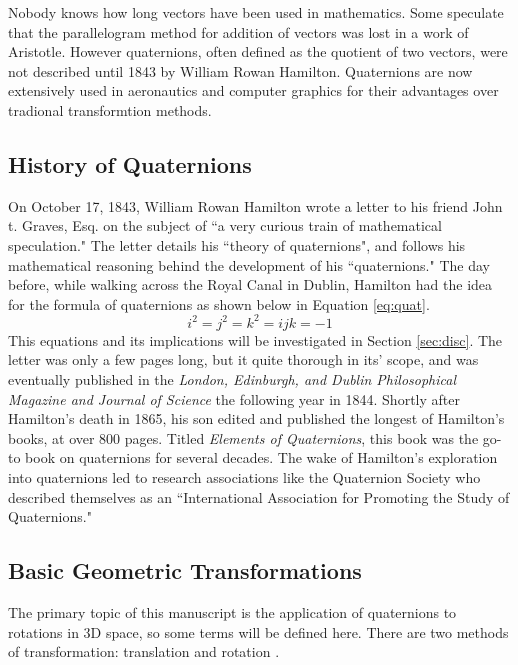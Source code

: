 Nobody knows how long vectors have been used in mathematics.
Some speculate that the parallelogram method for addition of vectors was lost in a work of Aristotle.
However quaternions, often defined as the quotient of two vectors, were not described until 1843 by William Rowan Hamilton.
Quaternions are now extensively used in aeronautics and computer graphics for their advantages over tradional transformtion methods.


\subsection{History of Quaternions}

On October 17, 1843, William Rowan Hamilton wrote a letter to his friend John t. Graves, Esq. on the subject of ``a very curious train of mathematical speculation."
The letter details his ``theory of quaternions", and follows his mathematical reasoning behind the development of his ``quaternions."
The day before, while walking across the Royal Canal in Dublin, Hamilton had the idea for the formula of quaternions as shown below in Equation \ref{eq:quat}.
\begin{equation}
\label{eq:quat}
i^2 = j^2 = k^2 = ijk = -1
\end{equation}
This equations and its implications will be investigated in Section \ref{sec:disc}.
The letter was only a few pages long, but it quite thorough in its' scope, and was eventually published in the \textit{London, Edinburgh, and Dublin Philosophical Magazine and Journal of Science} the following year in 1844.
Shortly after Hamilton's death in 1865, his son edited and published the longest of Hamilton's books, at over 800 pages.
Titled \textit{Elements of Quaternions}, this book was the go-to book on quaternions for several decades.
The wake of Hamilton's exploration into quaternions led to research associations like the Quaternion Society who described themselves as an ``International Association for Promoting the Study of Quaternions."

\subsection{Basic Geometric Transformations}
\label{sub:geo}

The primary topic of this manuscript is the application of quaternions to rotations in 3D space, so some terms will be defined here.
There are two methods of transformation: translation and rotation \cite{animation}.

